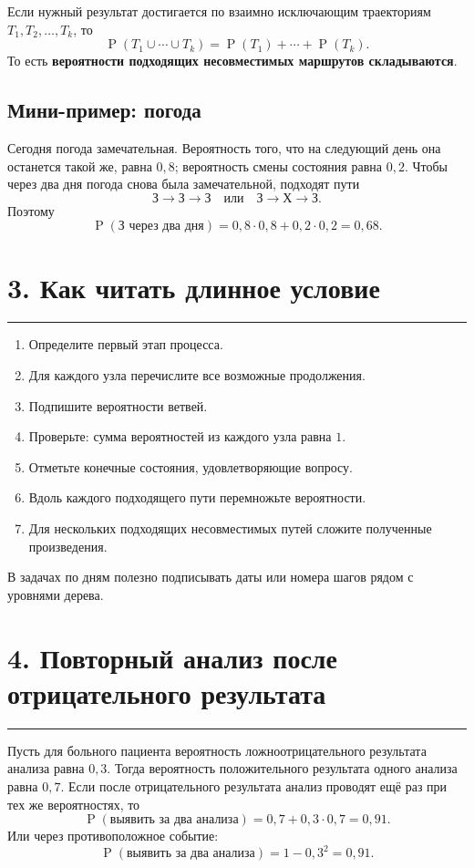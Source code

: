\documentclass[a4paper,12pt]{article}
\newcommand{\sectionrule}{\vspace{-0.4em}\textcolor{accent}{\rule{\linewidth}{0.7pt}}\vspace{0.4em}}
\newcommand{\key}[1]{\textcolor{darkaccent}{\textbf{#1}}}
\newcommand{\prob}[1]{\operatorname{P}\!\left(#1\right)}
\begin{document}
Если нужный результат достигается по взаимно исключающим траекториям \(T_1,T_2,\ldots,T_k\), то
\[
\prob{T_1\cup\cdots\cup T_k}=\prob{T_1}+\cdots+\prob{T_k}.
\]
То есть \key{вероятности подходящих несовместимых маршрутов складываются}.

\subsection*{Мини-пример: погода}
Сегодня погода замечательная. Вероятность того, что на следующий день она останется такой же, равна \(0{,}8\); вероятность смены состояния равна \(0{,}2\). Чтобы через два дня погода снова была замечательной, подходят пути
\[
\text{З}\to\text{З}\to\text{З}
\quad\text{или}\quad
\text{З}\to\text{Х}\to\text{З}.
\]
Поэтому
\[
\prob{\text{З через два дня}}=0{,}8\cdot0{,}8+0{,}2\cdot0{,}2=0{,}68.
\]

\section*{3. Как читать длинное условие}
\sectionrule
\begin{enumerate}
\item Определите первый этап процесса.
\item Для каждого узла перечислите все возможные продолжения.
\item Подпишите вероятности ветвей.
\item Проверьте: сумма вероятностей из каждого узла равна \(1\).
\item Отметьте конечные состояния, удовлетворяющие вопросу.
\item Вдоль каждого подходящего пути перемножьте вероятности.
\item Для нескольких подходящих несовместимых путей сложите полученные произведения.
\end{enumerate}
В задачах по дням полезно подписывать даты или номера шагов рядом с уровнями дерева.

\section*{4. Повторный анализ после отрицательного результата}
\sectionrule
Пусть для больного пациента вероятность ложноотрицательного результата анализа равна \(0{,}3\). Тогда вероятность положительного результата одного анализа равна \(0{,}7\). Если после отрицательного результата анализ проводят ещё раз при тех же вероятностях, то
\[
\prob{\text{выявить за два анализа}}=0{,}7+0{,}3\cdot0{,}7=0{,}91.
\]
Или через противоположное событие:
\[
\prob{\text{выявить за два анализа}}=1-0{,}3^2=0{,}91.
\]
\end{document}
